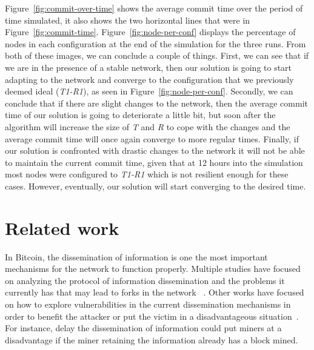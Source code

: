 \documentclass{dads}   %
\begin{document}
Figure~\ref{fig:commit-over-time} shows the average commit time over the period of time simulated, it also shows the two horizontal lines that were in Figure~\ref{fig:commit-time}. Figure~\ref{fig:node-per-conf} displays the percentage of nodes in each configuration at the end of the simulation for the three runs. From both of these images, we can conclude a couple of things. First, we can see that if we are in the presence of a stable network, then our solution is going to start adapting to the network and converge to the configuration that we previously deemed ideal (\textsl{T1-R1}), as seen in Figure~\ref{fig:node-per-conf}. Secondly, we can conclude that if there are slight changes to the network, then the average commit time of our solution is going to deteriorate a little bit, but soon after the algorithm will increase the size of \textsl{T} and \textsl{R} to cope with the changes and the average commit time will once again converge to more regular times. Finally, if our solution is confronted with drastic changes to the network it will not be able to maintain the current commit time, given that at 12 hours into the simulation most nodes were configured to \textsl{T1-R1} which is not resilient enough for these cases. However, eventually, our solution will start converging to the desired time. 

\section{Related work}
In Bitcoin, the dissemination of information is one the most important mechanisms for the network to function properly. Multiple studies have focused on analyzing the protocol of information dissemination and the problems it currently has that may lead to forks in the network ~\cite{decker2013information,croman2016scaling,miller2015discovering}.
Other works have focused on how to explore vulnerabilities in the current dissemination mechanisms in order to benefit the attacker or put the victim in a disadvantageous situation~\cite{apostolaki2016hijacking, sapirshtein2016optimal, eyal2014majority}. For instance, delay the dissemination of information could put miners at a disadvantage if the miner retaining the information already has a block mined.
\end{document}
